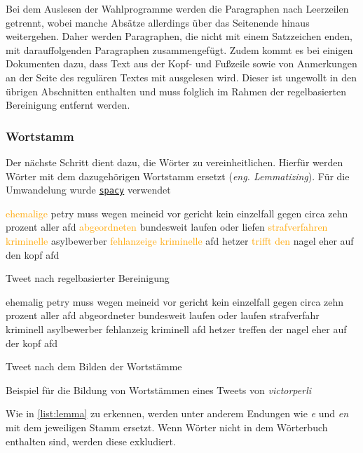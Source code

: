 Bei dem Auslesen der Wahlprogramme werden die Paragraphen nach Leerzeilen getrennt, wobei manche Absätze allerdings über das Seitenende hinaus weitergehen. Daher werden Paragraphen, die nicht mit einem Satzzeichen enden, mit darauffolgenden Paragraphen zusammengefügt. Zudem kommt es bei einigen Dokumenten dazu, dass Text aus der Kopf- und Fußzeile sowie von Anmerkungen an der Seite des regulären Textes mit ausgelesen wird. Dieser ist ungewollt in den übrigen Abschnitten enthalten und muss folglich im Rahmen der regelbasierten Bereinigung entfernt werden.

\subsubsection{Wortstamm}

Der nächste Schritt dient dazu, die Wörter zu vereinheitlichen. Hierfür werden Wörter mit dem dazugehörigen Wortstamm ersetzt (\textit{eng. Lemmatizing}). Für die Umwandelung wurde \href{https://spacy.io/}{\texttt{spacy}} verwendet


\begin{code}[H]
    {\footnotesize
    \begin{subcode}{0.45\textwidth}
        \textcolor{orange}{ehemalige} petry muss wegen meineid vor gericht kein einzelfall gegen circa zehn prozent aller afd \textcolor{orange}{abgeordneten} bundesweit laufen oder liefen \textcolor{orange}{strafverfahren} \textcolor{orange}{kriminelle} asylbewerber \textcolor{orange}{fehlanzeige} \textcolor{orange}{kriminelle} afd hetzer \textcolor{orange}{trifft} \textcolor{orange}{den} nagel eher auf den kopf afd
        \caption{Tweet nach regelbasierter Bereinigung}
    \end{subcode}\hfill
    \begin{subcode}{0.45\textwidth}
        ehemalig petry muss wegen meineid vor gericht kein einzelfall gegen circa zehn prozent aller afd abgeordneter bundesweit laufen oder laufen strafverfahr kriminell asylbewerber fehlanzeig kriminell afd hetzer treffen der nagel eher auf der kopf afd
        \caption{Tweet nach dem Bilden der Wortstämme}
    \end{subcode}\hfill
    }
    \caption[Bildung von Wortstämmen]{Beispiel für die Bildung von Wortstämmen eines Tweets von \textit{victorperli}} \label{list:lemma}
\end{code}

Wie in \autoref{list:lemma} zu erkennen, werden unter anderem Endungen wie \textit{e} und \textit{en} mit dem jeweiligen Stamm ersetzt. Wenn Wörter nicht in dem Wörterbuch enthalten sind, werden diese exkludiert.

